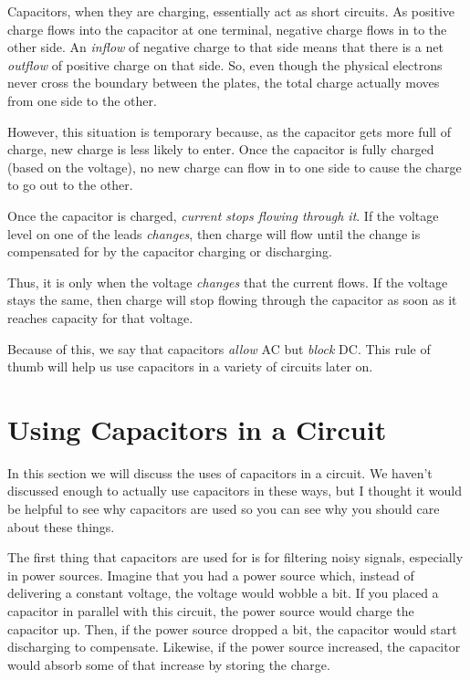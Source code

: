 Capacitors, when they are charging, essentially act as short circuits.
As positive charge flows into the capacitor at one terminal, negative charge flows in to the other side.
An \emph{inflow} of negative charge to that side means that there is a net \emph{outflow} of positive charge on that side.
So, even though the physical electrons never cross the boundary between the plates, the total charge actually moves from one side to the other.

However, this situation is temporary because, as the capacitor gets more full of charge, new charge is less likely to enter.
Once the capacitor is fully charged (based on the voltage), no new charge can flow in to one side to cause the charge to go out to the other.

Once the capacitor is charged, \emph{current stops flowing through it}.
If the voltage level on one of the leads \emph{changes}, then charge will flow until the change is compensated for by the capacitor charging or discharging.

Thus, it is only when the voltage \emph{changes} that the current flows.
If the voltage stays the same, then charge will stop flowing through the capacitor as soon as it reaches capacity for that voltage.

Because of this, we say that capacitors \emph{allow} AC but \emph{block} DC.
This rule of thumb will help us use capacitors in a variety of circuits later on.

\section{Using Capacitors in a Circuit}

In this section we will discuss the uses of capacitors in a circuit.
We haven't discussed enough to actually use capacitors in these ways, but I thought it would be helpful to see why capacitors are used so you can see why you should care about these things.

The first thing that capacitors are used for is for filtering noisy signals, especially in power sources.
Imagine that you had a power source which, instead of delivering a constant voltage, the voltage would wobble a bit.
If you placed a capacitor in parallel with this circuit, the power source would charge the capacitor up.
Then, if the power source dropped a bit, the capacitor would start discharging to compensate.
Likewise, if the power source increased, the capacitor would absorb some of that increase by storing the charge.


